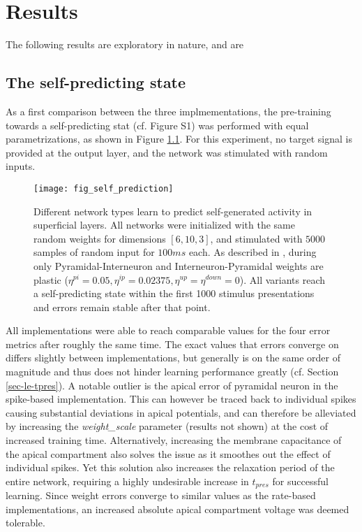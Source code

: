 
\chapter{Results}

The following results are exploratory in nature, and are 

\section{The self-predicting state}

As a first comparison between the three implmementations, the pre-training towards a self-predicting stat (cf.
\cite{sacramento2018dendritic} Figure S1) was performed with equal parametrizations, as shown in Figure
\ref{fig-self-pred}. For this experiment, no target signal is provided at the output layer, and the network was
stimulated with random inputs.



\begin{figure}[t]
    \centering
    \texttt{[image: fig\_self\_prediction]}
    \caption{Different network types learn to predict self-generated activity in superficial layers. All networks were
        initialized with the same random weights for dimensions $[6, 10, 3]$, and stimulated with $5000$ samples of random input for $100ms$ each.
        As described in \cite{sacramento2018dendritic}, during only Pyramidal-Interneuron and Interneuron-Pyramidal
        weights are plastic ($\eta^{pi}=0.05, \eta^{ip}=0.02375, \eta^{up}=\eta^{down}=0$). All variants reach a
        self-predicting state within the first 1000 stimulus presentations and errors remain stable after that point.}
    \label{fig-self-pred}
\end{figure}

All implementations were able to reach comparable values for the four error metrics after roughly the same time. The
exact values that errors converge on differs slightly between implementations, but generally is on the same order of
magnitude and thus does not hinder learning performance greatly (cf. Section \ref{sec-le-tpres}). A notable outlier is
the apical error of pyramidal neuron in the spike-based implementation. This can however be traced back to individual
spikes causing substantial deviations in apical potentials, and can therefore be alleviated by increasing the
\textit{weight\_scale} parameter (results not shown) at the cost of increased training time. Alternatively, increasing
the membrane capacitance of the apical compartment also solves the issue as it smoothes out the effect of individual
spikes. Yet this solution also increases the relaxation period of the entire network, requiring a highly undesirable
increase in $t_{pres}$ for successful learning. Since weight errors converge to similar values as the rate-based
implementations, an increased absolute apical compartment voltage was deemed tolerable.



